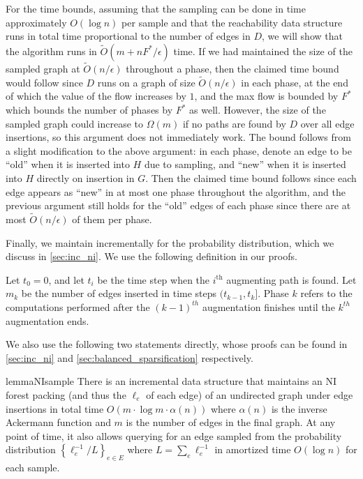 \documentclass[11pt,a4paper]{article}
\newcommand{\tO}{\ensuremath{\widetilde O}}
\newcommand{\eps}{\epsilon}
\begin{document}
For the time bounds, assuming that the sampling can be done in time approximately $O(\log n)$ per sample and that the reachability data structure runs in total time proportional to the number of edges in $D$, we will show that the algorithm runs in $\tO(m + nF^*/\eps)$ time. If we had maintained the size of the sampled graph at $\tO(n/\eps)$ throughout a phase, then the claimed time bound would follow since $D$ runs on a graph of size $\tO(n/\eps)$ in each phase, at the end of which the value of the flow increases by $1$, and the max flow is bounded by $F^*$ which bounds the number of phases by $F^*$ as well. However, the size of the sampled graph could increase to $\Omega(m)$ if no paths are found by $D$ over all edge insertions, so this argument does not immediately work. The bound follows from a slight modification to the above argument: in each phase, denote an edge to be ``old'' when it is inserted into $H$ due to sampling, and ``new'' when it is inserted into $H$ directly on insertion in $G$. Then the claimed time bound follows since each edge appears as ``new'' in at most one phase throughout the algorithm, and the previous argument still holds for the ``old'' edges of each phase since there are at most $\tO(n/\eps)$ of them per phase.

Finally, we maintain \niindices incrementally for the probability distribution, which we discuss in \cref{sec:inc_ni}.
We use the following definition in our proofs.

\begin{definition}[Phase]
\label{def:phase}
Let $t_0 = 0$, and let $t_i$ be the time step when the $i^{\mathrm{th}}$ augmenting path is found. Let $m_k$ be the number of edges inserted in time steps $(t_{k-1}, t_k]$. Phase $k$ refers to the computations performed after the $(k-1)^{th}$ augmentation finishes until the $k^{th}$ augmentation ends.
\end{definition}

We also use the following two statements directly, whose proofs can be found in \cref{sec:inc_ni} and \cref{sec:balanced_sparsification} respectively.

\begin{restatable}{lemma}{NIsample}
\label{lem:NI_sample}
There is an incremental data structure that maintains an NI forest packing (and thus the \niindex $\ell_e$ of each edge) of an undirected graph under edge insertions in total time $O( m \cdot \log m \cdot \alpha(n))$ where $\alpha(n)$ is the inverse Ackermann function and $m$ is the number of edges in the final graph. At any point of time, it also allows querying for an edge sampled from the probability distribution $\left\{ \ell_e^{-1}/L \right\}_{e \in E}$ where $L = \sum_e \ell_e^{-1}$ in amortized time $O(\log n)$ for each sample.
\end{restatable}
\end{document}

